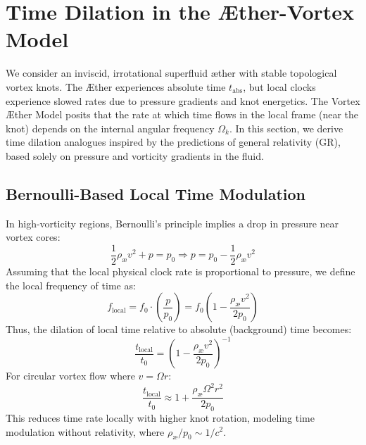 
\section{Time Dilation in the Æther-Vortex Model}\label{sec:Part-1}
We consider an inviscid, irrotational superfluid æther with stable topological vortex knots. The Æther experiences absolute time $t_{\text{abs}}$, but local clocks experience slowed rates due to pressure gradients and knot energetics. The Vortex Æther Model posits that the rate at which time flows in the local frame (near the knot) depends on the internal angular frequency $\Omega_k$. In this section, we derive time dilation analogues inspired by the predictions of general relativity (GR), based solely on pressure and vorticity gradients in the fluid.

\subsection{Bernoulli-Based Local Time Modulation}
In high-vorticity regions, Bernoulli's principle implies a drop in pressure near vortex cores:
\begin{equation}
    \frac{1}{2} \rho_\text{æ} v^2 + p = p_0 \Rightarrow p = p_0 - \frac{1}{2} \rho_\text{æ} v^2
\end{equation}
Assuming that the local physical clock rate is proportional to pressure, we define the local frequency of time as:
\begin{equation}
    f_{\text{local}} = f_0 \cdot \left( \frac{p}{p_0} \right) = f_0 \left( 1 - \frac{\rho_\text{æ} v^2}{2p_0} \right)
\end{equation}
Thus, the dilation of local time relative to absolute (background) time becomes:
\begin{equation}
    \frac{t_{\text{local}}}{t_0} = \left( 1 - \frac{\rho_\text{æ} v^2}{2p_0} \right)^{-1}
\end{equation}
For circular vortex flow where $v = \Omega r$:
\begin{equation}
    \frac{t_{\text{local}}}{t_0} \approx 1 + \frac{\rho_\text{æ} \Omega^2 r^2}{2p_0}
\end{equation}
This reduces time rate locally with higher knot rotation, modeling time modulation without relativity, where $\rho_\text{æ}/p_0 \sim 1/c^2$.

